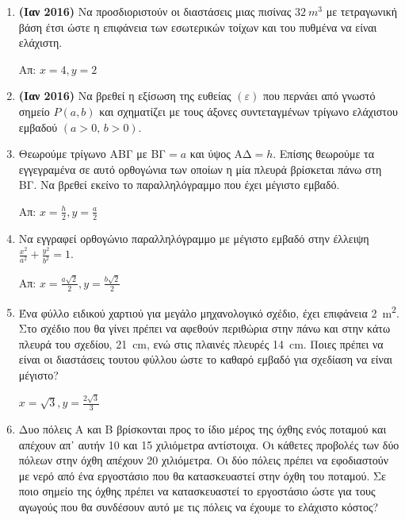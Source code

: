 



\pagestyle{askhseis}



\begin{center}
  \minibox{\large \bfseries \textcolor{Col1}{Προβλήματα Ακροτάτων και Ρυθμού Μεταβολής}}
\end{center}

\vspace{\baselineskip}

\begin{enumerate}

	\item {\bfseries (Ιαν 2016)} Να προσδιοριστούν οι διαστάσεις μιας πισίνας $ \SI{32}{m^{3}} $ με
		τετραγωνική βάση έτσι ώστε η επιφάνεια των εσωτερικών τοίχων και του
		πυθμένα να είναι ελάχιστη. 

		\hfill Απ: $x=4, y=2$

	\item {\bfseries (Ιαν 2016)} Να βρεθεί η εξίσωση της ευθείας $ (\varepsilon)
		$ που περνάει από γνωστό σημείο $ P(a,b) $ και σχηματίζει με τους άξονες
		συντεταγμένων τρίγωνο ελάχιστου εμβαδού $ (a>0,\, b>0) $.

	\item Θεωρούμε τρίγωνο ΑΒΓ με  ΒΓ$=a $ και ύψος ΑΔ$=h$. Επίσης θεωρούμε τα
		εγγεγραμένα σε αυτό ορθογώνια των οποίων η μία πλευρά βρίσκεται πάνω στη
		ΒΓ. Να βρεθεί εκείνο το παραλληλόγραμμο που έχει μέγιστο εμβαδό.
		
		\hfill Απ: $ x = \frac{h}{2}, y= \frac{a}{2} $

	\item Να εγγραφεί ορθογώνιο παραλληλόγραμμο με μέγιστο εμβαδό στην έλλειψη $
		\frac{x^{2}}{a^{2}} + \frac{y^{2}}{b^{2}} = 1 $. 

		\hfill Απ: $ x = \frac{a\sqrt{2}}{2}, y = \frac{b \sqrt{2}}{2} $

	\item Ένα φύλλο ειδικού χαρτιού για μεγάλο μηχανολογικό σχέδιο, έχει
		επιφάνεια \SI{2}{m^{2}}. Στο σχέδιο που θα γίνει πρέπει να αφεθούν
		περιθώρια στην πάνω και στην κάτω πλευρά του σχεδίου, \SI{21}{cm}, ενώ
		στις πλαινές πλευρές \SI{14}{cm}. Ποιες πρέπει να είναι οι διαστάσεις
		τουτου φύλλου ώστε το καθαρό εμβαδό για σχεδίαση να είναι μέγιστο?

		\hfill $ x = \sqrt{3}, y = \frac{2 \sqrt{3}}{3} $

	\item Δυο πόλεις Α και Β βρίσκονται προς το ίδιο μέρος της όχθης ενός
		ποταμού και απέχουν απ᾽ αυτήν 10 και 15 χιλιόμετρα αντίστοιχα. Οι
		κάθετες προβολές των δύο πόλεων στην όχθη απέχουν 20 χιλιόμετρα. Οι δύο
		πόλεις πρέπει να εφοδιαστούν με νερό από ένα εργοστάσιο που θα
		κατασκευαστεί στην όχθη του ποταμού. Σε ποιο σημείο της όχθης πρέπει να
		κατασκευαστεί το εργοστάσιο ώστε για τους αγωγούς που θα συνδέσουν αυτό
		με τις πόλεις να έχουμε το ελάχιστο κόστος?


\end{enumerate}
